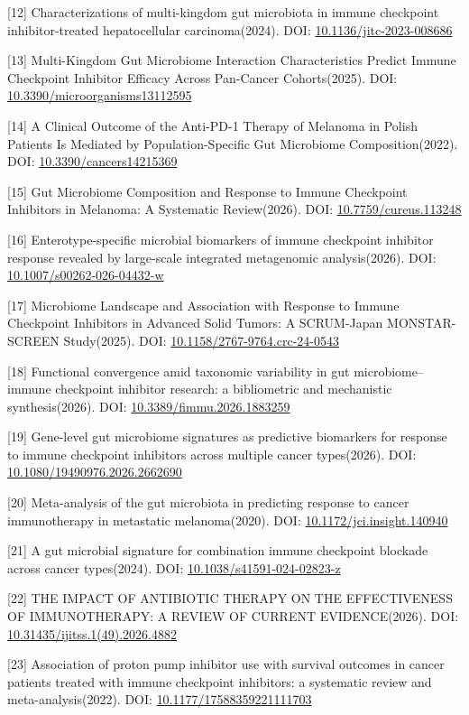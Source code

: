 \documentclass[11pt]{article}
\begin{document}
{[}12{]} Characterizations of multi-kingdom gut microbiota in immune checkpoint inhibitor-treated hepatocellular carcinoma(2024). DOI: \url{10.1136/jitc-2023-008686}

{[}13{]} Multi-Kingdom Gut Microbiome Interaction Characteristics Predict Immune Checkpoint Inhibitor Efficacy Across Pan-Cancer Cohorts(2025). DOI: \url{10.3390/microorganisms13112595}

{[}14{]} A Clinical Outcome of the Anti-PD-1 Therapy of Melanoma in Polish Patients Is Mediated by Population-Specific Gut Microbiome Composition(2022). DOI: \url{10.3390/cancers14215369}

{[}15{]} Gut Microbiome Composition and Response to Immune Checkpoint Inhibitors in Melanoma: A Systematic Review(2026). DOI: \url{10.7759/cureus.113248}

{[}16{]} Enterotype-specific microbial biomarkers of immune checkpoint inhibitor response revealed by large-scale integrated metagenomic analysis(2026). DOI: \url{10.1007/s00262-026-04432-w}

{[}17{]} Microbiome Landscape and Association with Response to Immune Checkpoint Inhibitors in Advanced Solid Tumors: A SCRUM-Japan MONSTAR-SCREEN Study(2025). DOI: \url{10.1158/2767-9764.crc-24-0543}

{[}18{]} Functional convergence amid taxonomic variability in gut microbiome--immune checkpoint inhibitor research: a bibliometric and mechanistic synthesis(2026). DOI: \url{10.3389/fimmu.2026.1883259}

{[}19{]} Gene-level gut microbiome signatures as predictive biomarkers for response to immune checkpoint inhibitors across multiple cancer types(2026). DOI: \url{10.1080/19490976.2026.2662690}

{[}20{]} Meta-analysis of the gut microbiota in predicting response to cancer immunotherapy in metastatic melanoma(2020). DOI: \url{10.1172/jci.insight.140940}

{[}21{]} A gut microbial signature for combination immune checkpoint blockade across cancer types(2024). DOI: \url{10.1038/s41591-024-02823-z}

{[}22{]} THE IMPACT OF ANTIBIOTIC THERAPY ON THE EFFECTIVENESS OF IMMUNOTHERAPY: A REVIEW OF CURRENT EVIDENCE(2026). DOI: \url{10.31435/ijitss.1(49).2026.4882}

{[}23{]} Association of proton pump inhibitor use with survival outcomes in cancer patients treated with immune checkpoint inhibitors: a systematic review and meta-analysis(2022). DOI: \url{10.1177/17588359221111703}
\end{document}
